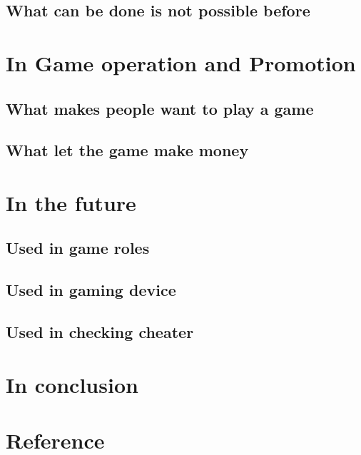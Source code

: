 \documentclass[12pt]{article}
\begin{document}
        \subsection{What can be done is not possible before}
    \section{In Game operation and Promotion}
        \subsection{What makes people want to play a game}
        \subsection{What let the game make money}
    \section{In the future}
        \subsection{Used in game roles}
        \subsection{Used in gaming device}
        \subsection{Used in checking cheater}
    \section{In conclusion}
    \pagebreak
    \section{Reference}
\end{document}
